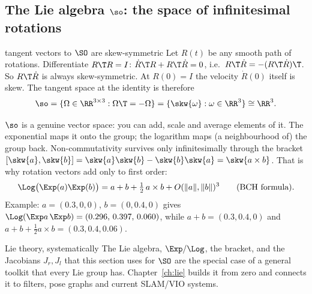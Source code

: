 \subsection{The Lie algebra $\so$: the space of infinitesimal rotations}\label{sec:rot:lie}\label{sec:rot:lie-algebra-space}
\begin{deriv}{tangent vectors to $\SO$ are skew-symmetric}
Let $R(t)$ be any smooth path of rotations. Differentiate $R\T R=I$: $\dot R\T R+R\T\dot R=0$, i.e.\ $R\T\dot R=-(R\T\dot R)\T$. So $R\T\dot R$ is always skew-symmetric. At $R(0)=I$ the velocity $\dot R(0)$ itself is skew. The tangent space at the identity is therefore
\[
\so=\{\Omega\in\RR^{3\times3}:\Omega\T=-\Omega\}=\{\skw{\omega}:\omega\in\RR^3\}\cong\RR^3 .
\]
\end{deriv}
$\so$ is a genuine vector space: you can add, scale and average elements of it. The exponential maps it onto the group; the logarithm maps (a neighbourhood of) the group back. Non-commutativity survives only infinitesimally through the bracket $[\skw{a},\skw{b}]=\skw{a}\skw{b}-\skw{b}\skw{a}=\skw{a\times b}$. That is why rotation vectors add only to first order:
\begin{equation}
\Log\big(\Exp(a)\Exp(b)\big)=a+b+\tfrac12\,a\times b+O(\|a\|,\|b\|)^3\qquad\text{(BCH formula).}\label{eq:rot:bch}
\end{equation}
Example: $a=(0.3,0,0)$, $b=(0,0.4,0)$ gives $\Log(\Exp a\,\Exp b)=(0.296,\,0.397,\,0.060)$, while $a+b=(0.3,0.4,0)$ and $a+b+\tfrac12a\times b=(0.3,0.4,0.06)$.

\begin{noteb}{Lie theory, systematically}
The Lie algebra, $\Exp/\Log$, the bracket, and the Jacobians $J_r,J_l$ that this section uses for $\SO$ are the special case of a general toolkit that every Lie group has. Chapter~\ref{ch:lie} builds it from zero and connects it to filters, pose graphs and current SLAM/VIO systems.
\end{noteb}
